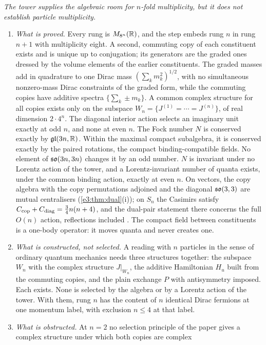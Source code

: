 \emph{The tower supplies the algebraic room for $n$-fold multiplicity, but it does not establish particle multiplicity.}
\begin{enumerate}[label=(\arabic*),leftmargin=2.2em]
\item \emph{What is proved.} Every rung is $M_{8^n}(\mathbb{R})$, and the step embeds rung $n$ in rung $n+1$ with multiplicity eight. A second, commuting copy
of each constituent exists and is unique up to conjugation; its generators are the graded ones dressed by the volume elements of the
earlier constituents. The graded masses add in quadrature to one Dirac mass $(\sum_km_k^2)^{1/2}$, with no simultaneous nonzero-mass Dirac constraints of the graded form, while the
commuting copies have additive spectra $\{\sum_k\pm m_k\}$. A common complex structure for all copies exists only on the subspace
$W_n=\{J^{(1)}=\cdots=J^{(n)}\}$, of real dimension $2\cdot4^n$. The diagonal interior action selects an imaginary unit exactly at odd $n$, and none
at even $n$. The Fock number $N$ is conserved exactly by $\mathfrak{gl}(3n,\mathbb{R})$. Within the maximal compact subalgebra, it is conserved exactly
by the paired rotations, the compact binding-compatible fields. No element of $\mathfrak{so}(3n,3n)$ changes it by an odd number. $N$ is invariant
under no Lorentz action of the tower, and a Lorentz-invariant number of quanta exists, under the common binding action, exactly at even
$n$. On vectors, the copy algebra with the copy permutations adjoined and the diagonal $\mathfrak{so}(3,3)$ are mutual centralisers
(\cref{e3:thm:dual}(i)); on $S_n$ the Casimirs satisfy $C_{\rm cop}+C_{\rm diag}=\tfrac34n(n+4)$, and the dual-pair statement there concerns the full
$O(n)$ action, reflections included \cite{Neergard20}. The compact field
between constituents is a one-body operator: it moves quanta and never creates one.
\item \emph{What is constructed, not selected.} A reading with $n$ particles in the sense of ordinary quantum mechanics needs three
structures together: the subspace $W_n$ with the complex structure $J|_{W_n}$, the additive Hamiltonian $H_u$ built from the commuting copies,
and the plain exchange $P$ with antisymmetry imposed. Each exists. None is selected by the algebra or by a Lorentz action of the tower.
With them, rung $n$ has the content of $n$ identical Dirac fermions at one momentum label, with exclusion $n\le4$ at that label.
\item \emph{What is obstructed.} At $n=2$ no selection principle of the paper gives a complex structure under which both copies are complex

\end{enumerate}
